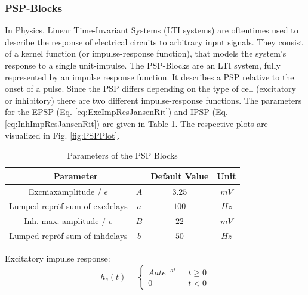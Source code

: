 \subsubsection{PSP-Blocks}
In Physics, Linear Time-Invariant Systems (LTI systems) are oftentimes used to describe the response of electrical circuits to arbitrary input signals. They consist of a kernel function (or impulse-response function), that models the system's response to a single unit-impulse.
The PSP-Blocks are an LTI system, fully represented by an impulse response function. It describes a PSP relative to the onset of a pulse. Since the PSP differs depending on the type of cell (excitatory or inhibitory) there are two different impulse-response functions. The parameters for the EPSP (Eq. \ref{eq:ExcImpResJansenRit}) and IPSP (Eq. \ref{eq:InhImpResJansenRit}) are given in Table \ref{tab:psp_params}. The respective plots are visualized in Fig. \ref{fig:PSPPlot}.
\begin{table}[H]
    \centering
    \begin{tabular}{ |c|c|c|c| }
        \hline
        \multicolumn{2}{|c|}{Parameter} & Default Value & Unit \\
        \hline
        \hline
        Exc\. max\. amplitude / $e$          & \(A\) & \(3.25\) & \(mV\) \\
        \hline
        Lumped repr\. of sum of exc\. delays & \(a\) & \(100\)  & \(Hz\) \\
        \hline
        Inh. max. amplitude / $e$          & \(B\) & \(22\)   & \(mV\) \\
        \hline
        Lumped repr\. of sum of inh\. delays & \(b\) & \(50\)   & \(Hz\) \\
        \hline
    \end{tabular}
    \caption{Parameters of the PSP Blocks}
    \label{tab:psp_params}
\end{table}

Excitatory impulse response:
\begin{equation}
    h_e(t) = \begin{cases}
                 Aate^{-at} & \mbox{ } t \geq 0 \\
                 0 & \mbox{ } t < 0
    \end{cases} \label{eq:ExcImpResJansenRit}
\end{equation}

